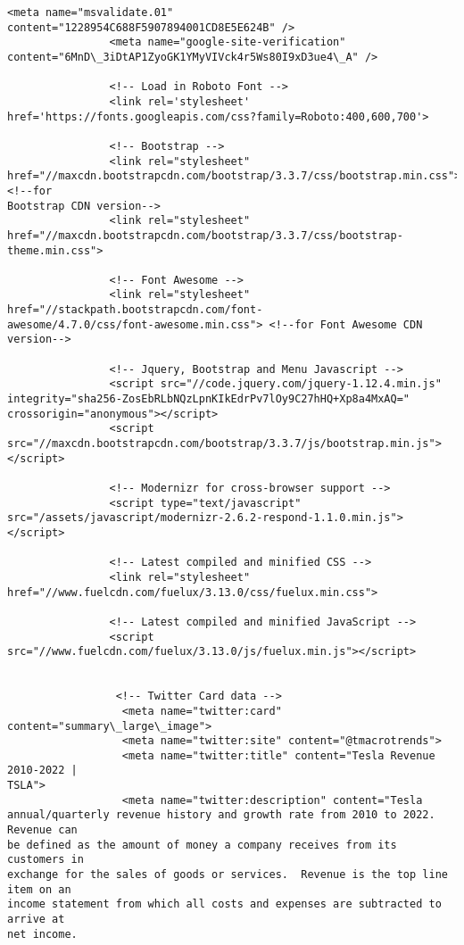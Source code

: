\documentclass[11pt]{article}
\begin{document}
\begin{Verbatim}[commandchars=\\\{\}]
                <meta name="msvalidate.01"
content="1228954C688F5907894001CD8E5E624B" />
                <meta name="google-site-verification"
content="6MnD\_3iDtAP1ZyoGK1YMyVIVck4r5Ws80I9xD3ue4\_A" />

                <!-- Load in Roboto Font -->
                <link rel='stylesheet'
href='https://fonts.googleapis.com/css?family=Roboto:400,600,700'>

                <!-- Bootstrap -->
                <link rel="stylesheet"
href="//maxcdn.bootstrapcdn.com/bootstrap/3.3.7/css/bootstrap.min.css"> <!--for
Bootstrap CDN version-->
                <link rel="stylesheet"
href="//maxcdn.bootstrapcdn.com/bootstrap/3.3.7/css/bootstrap-theme.min.css">

                <!-- Font Awesome -->
                <link rel="stylesheet" href="//stackpath.bootstrapcdn.com/font-
awesome/4.7.0/css/font-awesome.min.css"> <!--for Font Awesome CDN version-->

                <!-- Jquery, Bootstrap and Menu Javascript -->
                <script src="//code.jquery.com/jquery-1.12.4.min.js"
integrity="sha256-ZosEbRLbNQzLpnKIkEdrPv7lOy9C27hHQ+Xp8a4MxAQ="
crossorigin="anonymous"></script>
                <script
src="//maxcdn.bootstrapcdn.com/bootstrap/3.3.7/js/bootstrap.min.js"></script>

                <!-- Modernizr for cross-browser support -->
                <script type="text/javascript"
src="/assets/javascript/modernizr-2.6.2-respond-1.1.0.min.js"></script>

                <!-- Latest compiled and minified CSS -->
                <link rel="stylesheet"
href="//www.fuelcdn.com/fuelux/3.13.0/css/fuelux.min.css">

                <!-- Latest compiled and minified JavaScript -->
                <script
src="//www.fuelcdn.com/fuelux/3.13.0/js/fuelux.min.js"></script>


                 <!-- Twitter Card data -->
                  <meta name="twitter:card" content="summary\_large\_image">
                  <meta name="twitter:site" content="@tmacrotrends">
                  <meta name="twitter:title" content="Tesla Revenue 2010-2022 |
TSLA">
                  <meta name="twitter:description" content="Tesla
annual/quarterly revenue history and growth rate from 2010 to 2022. Revenue can
be defined as the amount of money a company receives from its customers in
exchange for the sales of goods or services.  Revenue is the top line item on an
income statement from which all costs and expenses are subtracted to arrive at
net income.


\end{Verbatim}
\end{document}
